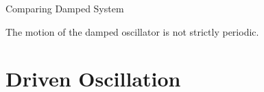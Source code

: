 \documentclass[12pt,compress,aspectratio=169]{beamer}
\begin{document}
\begin{frame}{Comparing Damped System}
  \centering
  
  The motion of the damped oscillator is not strictly periodic.
\end{frame}



%
%
%
%
%



\section{Driven Oscillation}
\end{document}
